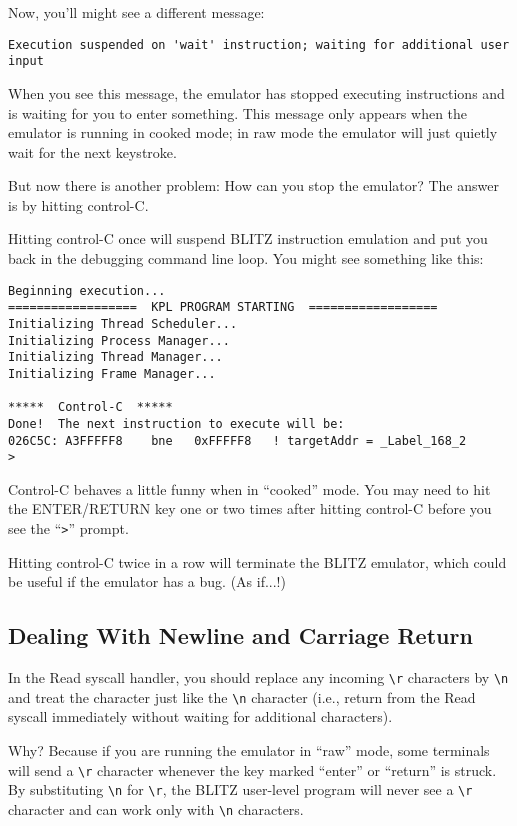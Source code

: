 \documentclass[11pt]{article}
\begin{document}
Now, you'll might see a different message:

\begin{verbatim}
Execution suspended on 'wait' instruction; waiting for additional user input
\end{verbatim}

When you see this message, the emulator has stopped executing
instructions and is waiting for you to enter something.  This message
only appears when the emulator is running in cooked mode; in raw mode
the emulator will just quietly wait for the next keystroke.

But now there is another problem: How can you stop the emulator?  The
answer is by hitting control-C.

Hitting control-C once will suspend BLITZ instruction emulation and
put you back in the debugging command line loop.  You might see
something like this:

\begin{verbatim}
Beginning execution...
==================  KPL PROGRAM STARTING  ==================
Initializing Thread Scheduler...
Initializing Process Manager...
Initializing Thread Manager...
Initializing Frame Manager...

*****  Control-C  *****
Done!  The next instruction to execute will be:
026C5C: A3FFFFF8    bne   0xFFFFF8   ! targetAddr = _Label_168_2
> 
\end{verbatim}

Control-C behaves a little funny when in ``cooked'' mode.  You may need
to hit the ENTER/RETURN key one or two times after hitting control-C
before you see the ``\verb+>+'' prompt.

Hitting control-C twice in a row will terminate the BLITZ emulator, which could be useful if the emulator has a bug.  (As if...!)

\subsection{Dealing With Newline and Carriage Return }

In the Read syscall handler, you should replace any incoming \verb+\r+
characters by \verb+\n+ and treat the character just like the \verb+\n+ character
(i.e., return from the Read syscall immediately without waiting for
additional characters).

Why?  Because if you are running the emulator in ``raw'' mode, some
terminals will send a \verb+\r+ character whenever the key marked ``enter'' or
``return'' is struck.  By substituting \verb+\n+ for \verb+\r+, the BLITZ user-level
program will never see a \verb+\r+ character and can work only with \verb+\n+
characters.
\end{document}
